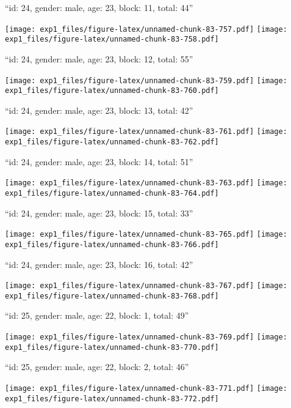 \documentclass[11pt,,]{article}
\begin{document}
\newpage
[1] 

``id: 24, gender: male, age: 23, block: 11, total: 44''

\texttt{[image: exp1\_files/figure-latex/unnamed-chunk-83-757.pdf]}
\texttt{[image: exp1\_files/figure-latex/unnamed-chunk-83-758.pdf]}

\newpage
[1] 

``id: 24, gender: male, age: 23, block: 12, total: 55''

\texttt{[image: exp1\_files/figure-latex/unnamed-chunk-83-759.pdf]}
\texttt{[image: exp1\_files/figure-latex/unnamed-chunk-83-760.pdf]}

\newpage
[1] 

``id: 24, gender: male, age: 23, block: 13, total: 42''

\texttt{[image: exp1\_files/figure-latex/unnamed-chunk-83-761.pdf]}
\texttt{[image: exp1\_files/figure-latex/unnamed-chunk-83-762.pdf]}

\newpage
[1] 

``id: 24, gender: male, age: 23, block: 14, total: 51''

\texttt{[image: exp1\_files/figure-latex/unnamed-chunk-83-763.pdf]}
\texttt{[image: exp1\_files/figure-latex/unnamed-chunk-83-764.pdf]}

\newpage
[1] 

``id: 24, gender: male, age: 23, block: 15, total: 33''

\texttt{[image: exp1\_files/figure-latex/unnamed-chunk-83-765.pdf]}
\texttt{[image: exp1\_files/figure-latex/unnamed-chunk-83-766.pdf]}

\newpage
[1] 

``id: 24, gender: male, age: 23, block: 16, total: 42''

\texttt{[image: exp1\_files/figure-latex/unnamed-chunk-83-767.pdf]}
\texttt{[image: exp1\_files/figure-latex/unnamed-chunk-83-768.pdf]}

\newpage
[1] 

``id: 25, gender: male, age: 22, block: 1, total: 49''

\texttt{[image: exp1\_files/figure-latex/unnamed-chunk-83-769.pdf]}
\texttt{[image: exp1\_files/figure-latex/unnamed-chunk-83-770.pdf]}

\newpage
[1] 

``id: 25, gender: male, age: 22, block: 2, total: 46''

\texttt{[image: exp1\_files/figure-latex/unnamed-chunk-83-771.pdf]}
\texttt{[image: exp1\_files/figure-latex/unnamed-chunk-83-772.pdf]}
\end{document}
